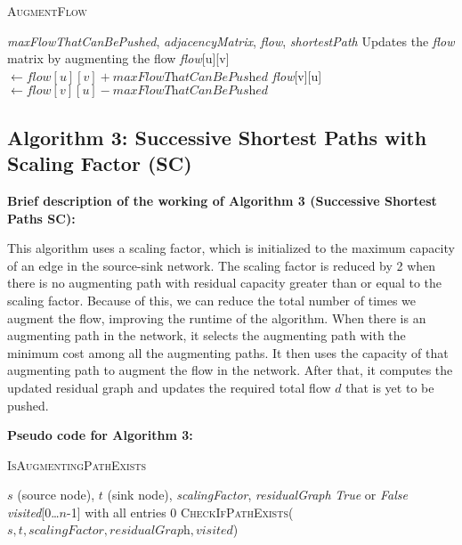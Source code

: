 \documentclass{article}
\begin{document}
\begin{algorithm}[H]
\caption{\textcolor{keywordcolor}{\textsc{AugmentFlow}}}
\begin{algorithmic}[1]
\State {} \textit{maxFlowThatCanBePushed}, \textit{adjacencyMatrix}, \textit{flow}, \textit{shortestPath}
\State {} Updates the \textit{flow} matrix by augmenting the flow
        \State \textit{flow}[u][v] $\gets \textit{flow}[u][v] + \textit{maxFlowThatCanBePushed}$
        \State \textit{flow}[v][u] $\gets \textit{flow}[v][u] - \textit{maxFlowThatCanBePushed}$
    \EndIf
\EndFor
\end{algorithmic}
\end{algorithm}

\subsection{Algorithm 3: Successive Shortest Paths with Scaling Factor (SC)}

\textbf{Brief description of the working of Algorithm 3 (Successive Shortest Paths SC):}

This algorithm uses a scaling factor, which is initialized to the maximum capacity of an edge in the source-sink network. The scaling factor is reduced by 2 when there is no augmenting path with residual capacity greater than or equal to the scaling factor. Because of this, we can reduce the total number of times we augment the flow, improving the runtime of the algorithm. When there is an augmenting path in the network, it selects the augmenting path with the minimum cost among all the augmenting paths. It then uses the capacity of that augmenting path to augment the flow in the network. After that, it computes the updated residual graph and updates the required total flow \(d\) that is yet to be pushed.~\cite{clrs}

\textbf{Pseudo code for Algorithm 3:}

\begin{algorithm}[H]
\caption{\textcolor{keywordcolor}{\textsc{IsAugmentingPathExists}}}
\begin{algorithmic}[1]
\State {} $s$ (source node), $t$ (sink node), \textit{scalingFactor}, \textit{residualGraph}
\State {} \textit{True} or \textit{False}
\State {} \textit{visited}[0…$n$-1] with all entries 0
\State \Return \textcolor{identifiercolor}{\textsc{CheckIfPathExists}}($s, t, \textit{scalingFactor}, \textit{residualGraph}, \textit{visited}$)
\end{algorithmic}
\end{algorithm}
\end{document}
